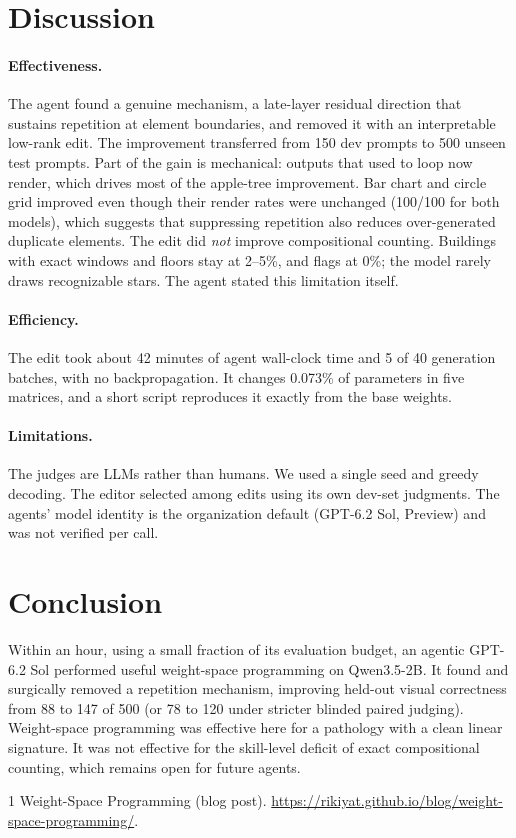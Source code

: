\documentclass[11pt]{article}
\begin{document}
\section{Discussion}
\paragraph{Effectiveness.} The agent found a genuine mechanism, a late-layer residual direction that sustains repetition at element boundaries, and removed it with an interpretable low-rank edit. The improvement transferred from 150 dev prompts to 500 unseen test prompts.
Part of the gain is mechanical: outputs that used to loop now render, which drives most of the apple-tree improvement. Bar chart and circle grid improved even though their render rates were unchanged (100/100 for both models), which suggests that suppressing repetition also reduces over-generated duplicate elements.
The edit did \emph{not} improve compositional counting. Buildings with exact windows and floors stay at 2--5\%, and flags at 0\%; the model rarely draws recognizable stars. The agent stated this limitation itself.
\paragraph{Efficiency.} The edit took about 42 minutes of agent wall-clock time and 5 of 40 generation batches, with no backpropagation. It changes 0.073\% of parameters in five matrices, and a short script reproduces it exactly from the base weights.
\paragraph{Limitations.} The judges are LLMs rather than humans. We used a single seed and greedy decoding. The editor selected among edits using its own dev-set judgments. The agents' model identity is the organization default (GPT-6.2 Sol, Preview) and was not verified per call.

\section{Conclusion}
Within an hour, using a small fraction of its evaluation budget, an agentic GPT-6.2 Sol performed useful weight-space programming on Qwen3.5-2B. It found and surgically removed a repetition mechanism, improving held-out visual correctness from 88 to 147 of 500 (or 78 to 120 under stricter blinded paired judging).
Weight-space programming was effective here for a pathology with a clean linear signature. It was not effective for the skill-level deficit of exact compositional counting, which remains open for future agents.

\begin{thebibliography}{1}
 Weight-Space Programming (blog post). \url{https://rikiyat.github.io/blog/weight-space-programming/}.
\end{thebibliography}
\end{document}
